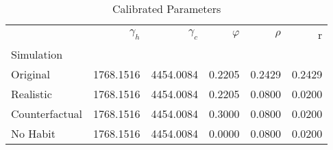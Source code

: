 \begin{table}
\centering
\caption{Calibrated Parameters}
\label{tab:calibs}
\begin{tabular}{lrrrrr}
\toprule
{} & $\gamma_h$ & $\gamma_c$ & $\varphi$ & $\rho$ &      r \\
Simulation     &            &            &           &        &        \\
\midrule
Original       &  1768.1516 &  4454.0084 &    0.2205 & 0.2429 & 0.2429 \\
Realistic      &  1768.1516 &  4454.0084 &    0.2205 & 0.0800 & 0.0200 \\
Counterfactual &  1768.1516 &  4454.0084 &    0.3000 & 0.0800 & 0.0200 \\
No Habit       &  1768.1516 &  4454.0084 &    0.0000 & 0.0800 & 0.0200 \\
\bottomrule
\end{tabular}
\end{table}
